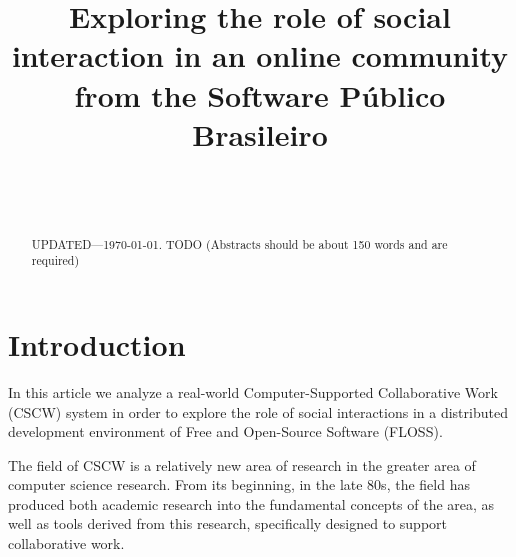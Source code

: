 \documentclass{sigchi}
\begin{document}
\title{Exploring the role of social interaction in an online community from the Software Público Brasileiro}

\author{%
  \\
  \\
}

\maketitle

\begin{abstract}
  UPDATED---\today. TODO (Abstracts should be about 150 words and are required)
\end{abstract}

 


\section{Introduction}

In this article we analyze a real-world Computer-Supported Collaborative Work (CSCW) system in order to explore the role of social interactions in a distributed development environment of Free and Open-Source Software (FLOSS).

The field of CSCW is a relatively new area of research in the greater area of computer science research. From its beginning, in the late 80s, the field has produced both academic research into the fundamental concepts of the area, as well as tools derived from this research, specifically designed to support collaborative work.
\end{document}
